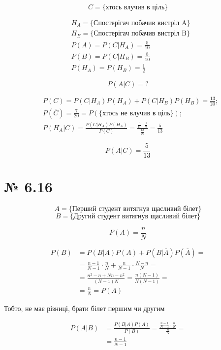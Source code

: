 \documentclass[11pt, a4paper]{article} %
\begin{document}
$$C = \{\text{хтось влучив в ціль}\}$$

\begin{align*}
    & H_A = \{\text{Спостерігач побачив вистріл A}\} \\
    & H_B = \{\text{Спостерігач побачив вистріл B}\} \\
    & P(A) = P(C|H_A) = \frac{5}{10} \\
    & P(B) = P(C|H_B) = \frac{8}{10} \\
    & P(H_A) = P(H_B) = \frac{1}{2}
\end{align*}

$$P(A|C) = ?$$

\begin{align*}
    & P(C) = P(C|H_A) P(H_A) + P(C|H_B) P(H_B) = \frac{13}{20}; \\
    & P(\overline{C}) = \frac{7}{20} = P(\{\text{хтось не влучив в ціль}\}); \\
    & P(H_A|C) = \frac{P(C|H_A)P(H_A)}{P(C)} = \frac{\frac{5}{10}\cdot \frac{1}{2}}{\frac{13}{20}} = \frac{5}{13}
\end{align*}

\begin{mdframed}[style=ans]
    $$P(A|C) = \frac{5}{13}$$
\end{mdframed}

\section*{№ 6.16}
$$A = \{\text{Перший студент витягнув щасливий білет}\}$$
$$B = \{\text{Другий студент витягнув щасливий білет}\}$$

$$P(A) = \frac{n}{N}$$

\begin{align*}
    P(B) &= P(B|A)P(A) + P(B|\overline A) P(\overline A) = \\
    &= \frac{n-1}{N-1} \cdot \frac{n}{N} + \frac{n}{N-1} \cdot \frac{N-n}{N} = \\
    &= \frac{n^2-n+Nn-n^2}{(N-1)N} = \frac{n(N-1)}{N(N-1)} = \\
    &= \frac{n}{N} = P(A)
\end{align*}

\begin{mdframed}[style=ans]
    Тобто, не має різниці, брати білет першим чи другим
\end{mdframed}

\begin{align*}
    P(A|B) &= \frac{P(B|A)P(A)}{P(B)} = \frac{\frac{n-1}{N-1} \cdot \frac{n}{N}}{\frac{n}{N}} = \\
    &= \frac{n-1}{N-1}
\end{align*}
\end{document}
